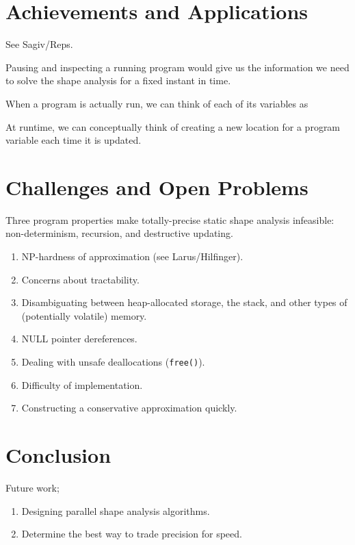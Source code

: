 \documentclass{article}
\begin{document}
\section{Achievements and Applications}

See Sagiv/Reps.

Pausing and inspecting a running program would give us the information we
need to solve the shape analysis for a fixed instant in time. 

When a program is actually run, we can think of each of its variables as

At runtime, we can conceptually think of creating a new location for a
program variable each time it is updated. 

\section{Challenges and Open Problems}

Three program properties make totally-precise static shape analysis
infeasible: non-determinism, recursion, and destructive updating.

\begin{enumerate}[1.]
    \item NP-hardness of approximation (see Larus/Hilfinger).
    \item Concerns about tractability.
    \item Disambiguating between heap-allocated storage, the stack, and
        other types of (potentially volatile) memory.
    \item NULL pointer dereferences.
    \item Dealing with unsafe deallocations (\texttt{free()}).
    \item Difficulty of implementation.
    \item Constructing a conservative approximation quickly.
\end{enumerate}

\section{Conclusion}

Future work;
\begin{enumerate}[1.]
    \item Designing parallel shape analysis algorithms.
    \item Determine the best way to trade precision for speed.
\end{enumerate}
\end{document}
